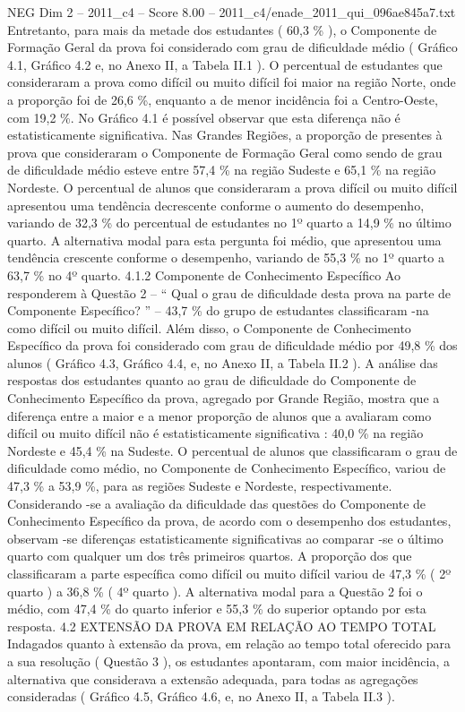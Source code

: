 \begin{textsample}{NEG Dim 2 – 2011\_c4 – Score 8.00 – 2011\_c4/enade\_2011\_qui\_096ae845a7.txt}
Entretanto, para mais da metade dos estudantes ( 60,3 \% ), o Componente de Formação Geral da prova foi considerado com grau de dificuldade médio ( Gráfico 4.1, Gráfico 4.2 e, no Anexo II, a Tabela II.1 ).
O percentual de estudantes que consideraram a prova como difícil ou muito difícil foi maior na região Norte, onde a proporção foi de 26,6 \%, enquanto a de menor incidência foi a Centro-Oeste, com 19,2 \%.
No Gráfico 4.1 é possível observar que esta diferença não é estatisticamente significativa.
Nas Grandes Regiões, a proporção de presentes à prova que consideraram o Componente de Formação Geral como sendo de grau de dificuldade médio esteve entre 57,4 \% na região Sudeste e 65,1 \% na região Nordeste.
O percentual de alunos que consideraram a prova difícil ou muito difícil apresentou uma tendência decrescente conforme o aumento do desempenho, variando de 32,3 \% do percentual de estudantes no 1º quarto a 14,9 \% no último quarto.
A alternativa modal para esta pergunta foi médio, que apresentou uma tendência crescente conforme o desempenho, variando de 55,3 \% no 1º quarto a 63,7 \% no 4º quarto. 4.1.2 Componente de Conhecimento Específico Ao responderem à Questão 2 – “ Qual o grau de dificuldade desta prova na parte de Componente Específico? ” – 43,7 \% do grupo de estudantes classificaram -na como difícil ou muito difícil.
Além disso, o Componente de Conhecimento Específico da prova foi considerado com grau de dificuldade médio por 49,8 \% dos alunos ( Gráfico 4.3, Gráfico 4.4, e, no Anexo II, a Tabela II.2 ).
A análise das respostas dos estudantes quanto ao grau de dificuldade do Componente de Conhecimento Específico da prova, agregado por Grande Região, mostra que a diferença entre a maior e a menor proporção de alunos que a avaliaram como difícil ou muito difícil não é estatisticamente significativa : 40,0 \% na região Nordeste e 45,4 \% na Sudeste.
O percentual de alunos que classificaram o grau de dificuldade como médio, no Componente de Conhecimento Específico, variou de 47,3 \% a 53,9 \%, para as regiões Sudeste e Nordeste, respectivamente.
Considerando -se a avaliação da dificuldade das questões do Componente de Conhecimento Específico da prova, de acordo com o desempenho dos estudantes, observam -se diferenças estatisticamente significativas ao comparar -se o último quarto com qualquer um dos três primeiros quartos.
A proporção dos que classificaram a parte específica como difícil ou muito difícil variou de 47,3 \% ( 2º quarto ) a 36,8 \% ( 4º quarto ).
A alternativa modal para a Questão 2 foi o médio, com 47,4 \% do quarto inferior e 55,3 \% do superior optando por esta resposta. 4.2 EXTENSÃO DA PROVA EM RELAÇÃO AO TEMPO TOTAL Indagados quanto à extensão da prova, em relação ao tempo total oferecido para a sua resolução ( Questão 3 ), os estudantes apontaram, com maior incidência, a alternativa que considerava a extensão adequada, para todas as agregações consideradas ( Gráfico 4.5, Gráfico 4.6, e, no Anexo II, a Tabela II.3 ).

\end{textsample}
